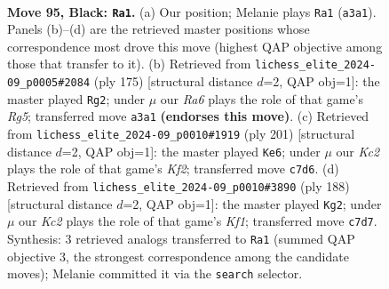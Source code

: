 \documentclass[11pt]{article}
\begin{document}
\clearpage

\begin{figure}[p]\centering
\begin{subfigure}{0.46\textwidth}\centering
\resizebox{\linewidth}{!}{%
\newchessgame
\chessboard[
  setfen={8/2k5/8/6R1/7r/r7/5K2/8 b - - 1 95},
  showmover=false,
  pgfstyle=straightmove, color=movearrow, markmove={a3-a1}
]}
\caption{}
\end{subfigure}\hfill
\begin{subfigure}{0.46\textwidth}\centering
\resizebox{\linewidth}{!}{%
\newchessgame
\chessboard[
  setfen={5k2/8/8/8/6r1/2K5/8/R7 b - - 29 88},
  showmover=false,
  pgfstyle=straightmove, color=movearrow, markmove={g4-g2}
]}
\caption{}
\end{subfigure}
\\[4pt]
\begin{subfigure}{0.46\textwidth}\centering
\resizebox{\linewidth}{!}{%
\newchessgame
\chessboard[
  setfen={8/5k2/8/R7/8/2K5/6r1/8 b - - 20 101},
  showmover=false,
  pgfstyle=straightmove, color=movearrow, markmove={f7-e6}
]}
\caption{}
\end{subfigure}\hfill
\begin{subfigure}{0.46\textwidth}\centering
\resizebox{\linewidth}{!}{%
\newchessgame
\chessboard[
  setfen={8/4k3/2r5/8/8/8/3R4/5K2 w - - 4 95},
  showmover=false,
  pgfstyle=straightmove, color=movearrow, markmove={f1-g2}
]}
\caption{}
\end{subfigure}
\caption{\textbf{Move 95, Black: \texttt{Ra1}.} (a) Our position; Melanie plays \texttt{Ra1} (\texttt{a3a1}). Panels (b)--(d) are the retrieved master positions whose correspondence most drove this move (highest QAP objective among those that transfer to it). (b) Retrieved from \texttt{lichess\_elite\_2024-09\_p0005\#2084} (ply 175) [structural distance $d$=2, QAP obj=1]: the master played \texttt{Rg2}; under $\mu$ our \emph{Ra6} plays the role of that game's \emph{Rg5}; transferred move \texttt{a3a1} \textbf{(endorses this move)}. (c) Retrieved from \texttt{lichess\_elite\_2024-09\_p0010\#1919} (ply 201) [structural distance $d$=2, QAP obj=1]: the master played \texttt{Ke6}; under $\mu$ our \emph{Kc2} plays the role of that game's \emph{Kf2}; transferred move \texttt{c7d6}. (d) Retrieved from \texttt{lichess\_elite\_2024-09\_p0010\#3890} (ply 188) [structural distance $d$=2, QAP obj=1]: the master played \texttt{Kg2}; under $\mu$ our \emph{Kc2} plays the role of that game's \emph{Kf1}; transferred move \texttt{c7d7}. Synthesis: 3 retrieved analogs transferred to \texttt{Ra1} (summed QAP objective 3, the strongest correspondence among the candidate moves); Melanie committed it via the \texttt{search} selector.}
\label{fig:thought-m189}
\end{figure}
\end{document}

